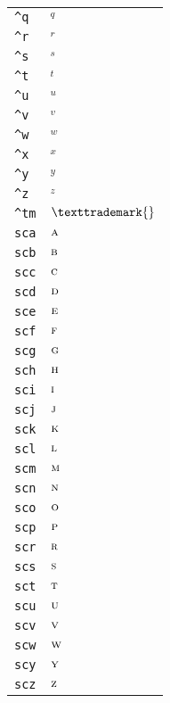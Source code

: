 \begin{longtable}{ll}
\texttt{\textasciicircum q}&${}^q{}$\\
\texttt{\textasciicircum r}&${}^r{}$\\
\texttt{\textasciicircum s}&${}^s{}$\\
\texttt{\textasciicircum t}&${}^t{}$\\
\texttt{\textasciicircum u}&${}^u{}$\\
\texttt{\textasciicircum v}&${}^v{}$\\
\texttt{\textasciicircum w}&${}^w{}$\\
\texttt{\textasciicircum x}&${}^x{}$\\
\texttt{\textasciicircum y}&${}^y{}$\\
\texttt{\textasciicircum z}&${}^z{}$\\
\texttt{\textasciicircum tm}&${}\texttrademark{}$\\
\texttt{sca}&${}\textsc{a}{}$\\
\texttt{scb}&${}\textsc{b}{}$\\
\texttt{scc}&${}\textsc{c}{}$\\
\texttt{scd}&${}\textsc{d}{}$\\
\texttt{sce}&${}\textsc{e}{}$\\
\texttt{scf}&${}\textsc{f}{}$\\
\texttt{scg}&${}\textsc{g}{}$\\
\texttt{sch}&${}\textsc{h}{}$\\
\texttt{sci}&${}\textsc{i}{}$\\
\texttt{scj}&${}\textsc{j}{}$\\
\texttt{sck}&${}\textsc{k}{}$\\
\texttt{scl}&${}\textsc{l}{}$\\
\texttt{scm}&${}\textsc{m}{}$\\
\texttt{scn}&${}\textsc{n}{}$\\
\texttt{sco}&${}\textsc{o}{}$\\
\texttt{scp}&${}\textsc{p}{}$\\
\texttt{scr}&${}\textsc{r}{}$\\
\texttt{scs}&${}\textsc{s}{}$\\
\texttt{sct}&${}\textsc{t}{}$\\
\texttt{scu}&${}\textsc{u}{}$\\
\texttt{scv}&${}\textsc{v}{}$\\
\texttt{scw}&${}\textsc{w}{}$\\
\texttt{scy}&${}\textsc{y}{}$\\
\texttt{scz}&${}\textsc{z}{}$\\

\end{longtable}
